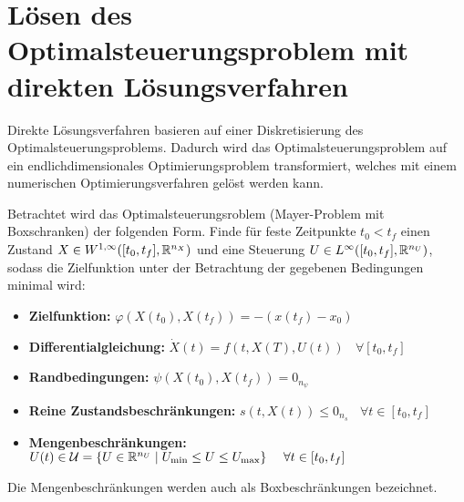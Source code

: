 \chapter{Lösen des Optimalsteuerungsproblem mit direkten Lösungsverfahren}

Direkte Lösungsverfahren basieren auf einer Diskretisierung des Optimalsteuerungsproblems. Dadurch wird das Optimalsteuerungsproblem auf ein endlichdimensionales Optimierungsproblem transformiert, welches mit einem numerischen Optimierungsverfahren gelöst werden kann.

Betrachtet wird das Optimalsteuerungsroblem (Mayer-Problem mit Boxschranken) der folgenden Form. Finde für feste Zeitpunkte $t_0 < t_f$ einen Zustand $X \in W^{1, \infty} ([t_0,t_f], \mathbb{R}^{n_X})$ und eine Steuerung $U \in L^{\infty} ([t_0,t_f], \mathbb{R}^{n_U})$, sodass die Zielfunktion unter der Betrachtung der gegebenen Bedingungen minimal wird:
\begin{itemize}
\item \textbf{Zielfunktion:} $\varphi(X(t_0),X(t_f)) = -(x(t_f) - x_0)$
%
\item \textbf{Differentialgleichung:} $\dot{X}(t) = f(t,X(T),U(t)) \ \ \ \ \forall [t_0,t_f]$
%
\item \textbf{Randbedingungen:} $\psi(X(t_0),X(t_f)) = 0_{n_{\psi}}$
%
\item \textbf{Reine Zustandsbeschränkungen:} $s(t,X(t)) \leq 0_{n_s} \ \ \ \ \forall t \in [t_0,t_f]$
%
\item \textbf{Mengenbeschränkungen:} $U(t) \in \mathcal{U} = \lbrace U \in \mathbb{R}^{n_U} \mid U_{\min} \leq U \leq U_{\max} \rbrace \ \ \ \ \forall t \in [t_0, t_f]$
\end{itemize}
Die Mengenbeschränkungen werden auch als Boxbeschränkungen bezeichnet. 











